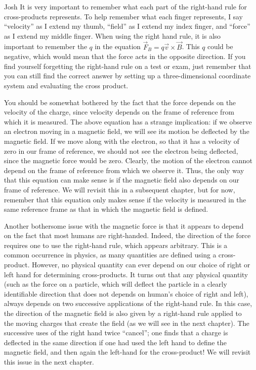 \begin{studentOpinion}{Josh}{}
It is very important to remember what each part of the right-hand rule for cross-products represents. To help remember what each finger represents, I say ``velocity'' as I extend my thumb, ``field'' as I extend my index finger, and ``force'' as I extend my middle finger. When using the right hand rule, it is also important to remember the $q$ in the equation $\vec F_B = q\vec v \times \vec B$. This $q$ could be negative, which would mean that the force acts in the opposite direction.
If you find yourself forgetting the right-hand rule on a test or exam, just remember that you can still find the correct answer by setting up a three-dimensional coordinate system and evaluating the cross product.
\end{studentOpinion}
You should be somewhat bothered by the fact that the force depends on the velocity of the charge, since velocity depends on the frame of reference from which it is measured. The above equation has a strange implication: if we observe an electron moving in a magnetic field, we will see its motion be deflected by the magnetic field. If we move along with the electron, so that it has a velocity of zero in our frame of reference, we should not see the electron being deflected, since the magnetic force would be zero. Clearly, the motion of the electron cannot depend on the frame of reference from which we observe it. Thus, the only way that this equation can make sense is if the magnetic field also depends on our frame of reference. We will revisit this in a subsequent chapter, but for now, remember that this equation only makes sense if the velocity is measured in the same reference frame as that in which the magnetic field is defined.

Another bothersome issue with the magnetic force is that it appears to depend on the fact that most humans are right-handed. Indeed, the direction of the force requires one to use the right-hand rule, which appears arbitrary. This is a common occurrence in physics, as many quantities are defined using a cross-product. However, no physical quantity can ever depend on our choice of right or left hand for determining cross-products. It turns out that any physical quantity (such as the force on a particle, which will deflect the particle in a clearly identifiable direction that does not depends on human's choice of right and left), always depends on two successive applications of the right-hand rule. In this case, the direction of the magnetic field is also given by a right-hand rule applied to the moving charges that create the field (as we will see in the next chapter). The successive uses of the right hand twice ``cancel''; one finds that a charge is deflected in the same direction if one had used the left hand to define the magnetic field, and then again the left-hand for the cross-product! We will revisit this issue in the next chapter.

